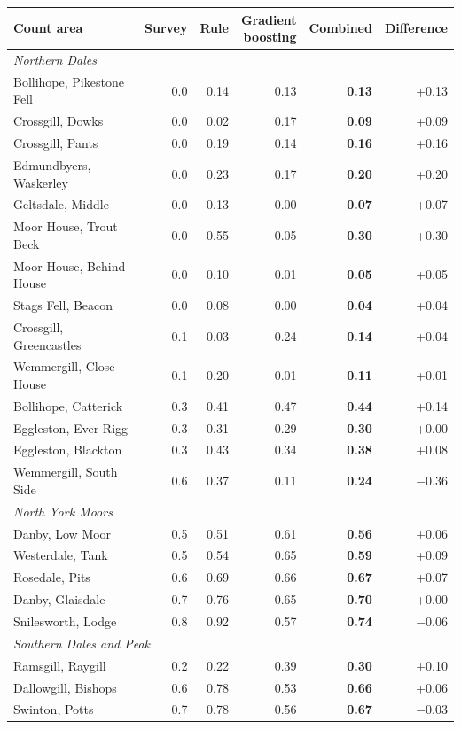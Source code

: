 \begin{tabular}{lrrrrr}
\toprule
Count area & Survey & Rule & \makecell[r]{Gradient\\boosting} & Combined & Difference \\
\midrule
\multicolumn{6}{l}{\textit{Northern Dales}} \\
Bollihope, Pikestone Fell & 0.0 & 0.14 & 0.13 & \textbf{0.13} & +0.13 \\
Crossgill, Dowks & 0.0 & 0.02 & 0.17 & \textbf{0.09} & +0.09 \\
Crossgill, Pants & 0.0 & 0.19 & 0.14 & \textbf{0.16} & +0.16 \\
Edmundbyers, Waskerley & 0.0 & 0.23 & 0.17 & \textbf{0.20} & +0.20 \\
Geltsdale, Middle & 0.0 & 0.13 & 0.00 & \textbf{0.07} & +0.07 \\
Moor House, Trout Beck & 0.0 & 0.55 & 0.05 & \textbf{0.30} & +0.30 \\
Moor House, Behind House & 0.0 & 0.10 & 0.01 & \textbf{0.05} & +0.05 \\
Stags Fell, Beacon & 0.0 & 0.08 & 0.00 & \textbf{0.04} & +0.04 \\
Crossgill, Greencastles & 0.1 & 0.03 & 0.24 & \textbf{0.14} & +0.04 \\
Wemmergill, Close House & 0.1 & 0.20 & 0.01 & \textbf{0.11} & +0.01 \\
Bollihope, Catterick & 0.3 & 0.41 & 0.47 & \textbf{0.44} & +0.14 \\
Eggleston, Ever Rigg & 0.3 & 0.31 & 0.29 & \textbf{0.30} & +0.00 \\
Eggleston, Blackton & 0.3 & 0.43 & 0.34 & \textbf{0.38} & +0.08 \\
Wemmergill, South Side & 0.6 & 0.37 & 0.11 & \textbf{0.24} & $-$0.36 \\
\midrule
\multicolumn{6}{l}{\textit{North York Moors}} \\
Danby, Low Moor & 0.5 & 0.51 & 0.61 & \textbf{0.56} & +0.06 \\
Westerdale, Tank & 0.5 & 0.54 & 0.65 & \textbf{0.59} & +0.09 \\
Rosedale, Pits & 0.6 & 0.69 & 0.66 & \textbf{0.67} & +0.07 \\
Danby, Glaisdale & 0.7 & 0.76 & 0.65 & \textbf{0.70} & +0.00 \\
Snilesworth, Lodge & 0.8 & 0.92 & 0.57 & \textbf{0.74} & $-$0.06 \\
\midrule
\multicolumn{6}{l}{\textit{Southern Dales and Peak}} \\
Ramsgill, Raygill & 0.2 & 0.22 & 0.39 & \textbf{0.30} & +0.10 \\
Dallowgill, Bishops & 0.6 & 0.78 & 0.53 & \textbf{0.66} & +0.06 \\
Swinton, Potts & 0.7 & 0.78 & 0.56 & \textbf{0.67} & $-$0.03 \\
\bottomrule
\end{tabular}

